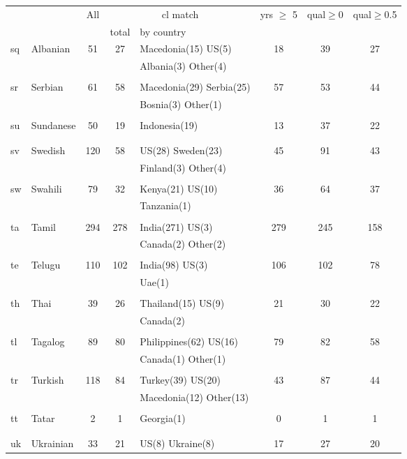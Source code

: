\begin{figure}[h]
\centering
\begin{tabular}{llcclccc}
&&All&\multicolumn{2}{c}{cl match}&yrs $\geq$ 5&qual$\geq$0&qual$\geq$0.5\\
&&&total&by country&&\\
\hline\hline
sq&Albanian&51&27&Macedonia(15) US(5) &18&39&27\\
&&&&Albania(3) Other(4) &&&\\
&&&&&&&\\
sr&Serbian&61&58&Macedonia(29) Serbia(25) &57&53&44\\
&&&&Bosnia(3) Other(1) &&&\\
&&&&&&&\\
su&Sundanese&50&19&Indonesia(19) &13&37&22\\
&&&&&&&\\
&&&&&&&\\
sv&Swedish&120&58&US(28) Sweden(23) &45&91&43\\
&&&&Finland(3) Other(4) &&&\\
&&&&&&&\\
sw&Swahili&79&32&Kenya(21) US(10) &36&64&37\\
&&&&Tanzania(1) &&&\\
&&&&&&&\\
ta&Tamil&294&278&India(271) US(3) &279&245&158\\
&&&&Canada(2) Other(2) &&&\\
&&&&&&&\\
te&Telugu&110&102&India(98) US(3) &106&102&78\\
&&&&Uae(1) &&&\\
&&&&&&&\\
th&Thai&39&26&Thailand(15) US(9) &21&30&22\\
&&&&Canada(2) &&&\\
&&&&&&&\\
tl&Tagalog&89&80&Philippines(62) US(16) &79&82&58\\
&&&&Canada(1) Other(1) &&&\\
&&&&&&&\\
tr&Turkish&118&84&Turkey(39) US(20) &43&87&44\\
&&&&Macedonia(12) Other(13) &&&\\
&&&&&&&\\
tt&Tatar&2&1&Georgia(1) &0&1&1\\
&&&&&&&\\
&&&&&&&\\
uk&Ukrainian&33&21&US(8) Ukraine(8) &17&27&20\\

\end{tabular}
\end{figure}
